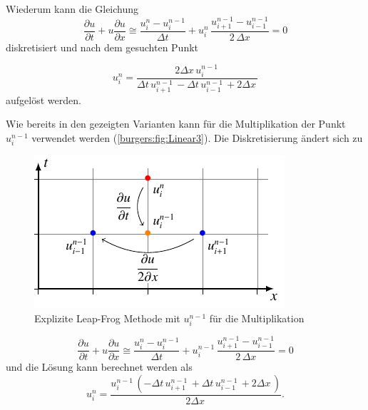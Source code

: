 	Wiederum kann die Gleichung
	\begin{equation}
	\frac {\partial u}{\partial t}+u{\frac {\partial u}{\partial x}} \cong \frac{u_{i}^{n}-u_{i}^{n-1}}{\Delta t}+ u_{i}^{n}\, \frac{u_{i+1}^{n-1}-u_{i-1}^{n-1}}{2\,\Delta x}=0
	\end{equation}
	diskretisiert und nach dem gesuchten Punkt


	\begin{equation}
	u_{i}^{n} = \frac{2 \Delta{x}\, u^{n-1}_{i}\,}{\Delta{t}\, u^{n-1}_{i+1}\, - \Delta{t}\, u^{n-1}_{i-1}\, + 2 \Delta{x}\,}
	\end{equation}
 aufgel\"ost werden.

\medskip

	Wie bereits in den gezeigten Varianten kann f\"ur die Multiplikation der Punkt $u_{i}^{n-1}$ verwendet werden (\autoref{burgers:fig:Linear3}).
	Die Diskretisierung \"andert sich zu

	\begin{figure}
	\centering
	\includegraphics[height=.4\textwidth]{papers/burgers/BurgersEquation/tikz/linear3/linear3.pdf}
	\caption{Explizite Leap-Frog Methode mit  $u_{i}^{n-1}$ f\"ur die Multiplikation}
	\label{burgers:fig:Linear3}
	\end{figure}



	\begin{equation}
		\frac {\partial u}{\partial t}+u{\frac {\partial u}{\partial x}} \cong \frac{u_{i}^{n}-u_{i}^{n-1}}{\Delta t}+ u_{i}^{n-1}\, \frac{u_{i+1}^{n-1}-u_{i-1}^{n-1}}{2\,\Delta x}=0
		\label{burgers:eq_ex_lf1}
	\end{equation}
 	und die L\"osung kann berechnet werden als
	\begin{equation}
	 u_{i}^{n} = \frac{u^{n-1}_{i}\, \left(- \Delta{t}\, u^{n-1}_{i+1}\, + \Delta{t}\, u^{n-1}_{i-1}\, + 2 \Delta{x}\,\right)}{2 \Delta{x}\,}.
		\label{burgers:eq_ex_sol_lf1}
	\end{equation}



